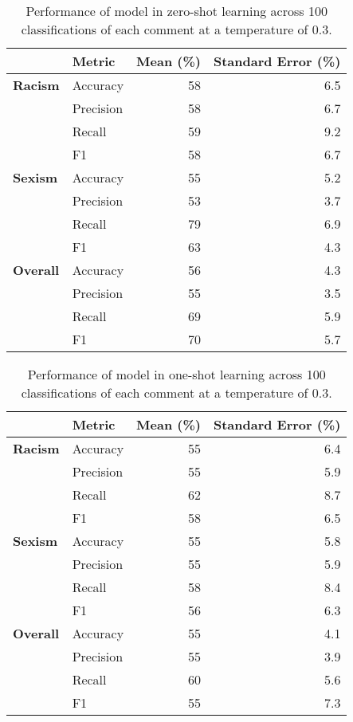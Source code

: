 \documentclass{bmcart}
\begin{document}
\begin{backmatter}
\begin{table}
\caption{\label{tab:zeroshot-summary}Performance of model in zero-shot learning across 100 classifications of each comment at a temperature of 0.3.}
\centering
\begin{tabular}[t]{llrr}
\hline
 & Metric & Mean (\%) & Standard Error (\%)\\
\hline
\textbf{Racism} & Accuracy & 58 & 6.5\\
\textbf{} & Precision & 58 & 6.7\\
\textbf{} & Recall & 59 & 9.2\\
\textbf{} & F1 & 58 & 6.7\\
\textbf{Sexism} & Accuracy & 55 & 5.2\\
\textbf{} & Precision & 53 & 3.7\\
\textbf{} & Recall & 79 & 6.9\\
\textbf{} & F1 & 63 & 4.3\\
\textbf{Overall} & Accuracy & 56 & 4.3\\
\textbf{} & Precision & 55 & 3.5\\
\textbf{} & Recall & 69 & 5.9\\
\textbf{} & F1 & 70 & 5.7\\
\hline
\end{tabular}
\end{table}










\begin{table}

\caption{\label{tab:oneshot-summary}Performance of model in one-shot learning across 100 classifications of each comment at a temperature of 0.3.}
\centering
\begin{tabular}[t]{llrr}
\hline
 & Metric & Mean (\%) & Standard Error (\%)\\
\hline
\textbf{Racism} & Accuracy & 55 & 6.4\\
\textbf{} & Precision & 55 & \vphantom{1} 5.9\\
\textbf{} & Recall & 62 & 8.7\\
\textbf{} & F1 & 58 & 6.5\\
\textbf{Sexism} & Accuracy & 55 & 5.8\\
\textbf{} & Precision & 55 & 5.9\\
\textbf{} & Recall & 58 & 8.4\\
\textbf{} & F1 & 56 & 6.3\\
\textbf{Overall} & Accuracy & 55 & 4.1\\
\textbf{} & Precision & 55 & 3.9\\
\textbf{} & Recall & 60 & 5.6\\
\textbf{} & F1 & 55 & 7.3\\
\hline
\end{tabular}
\end{table}











\end{backmatter}
\end{document}
